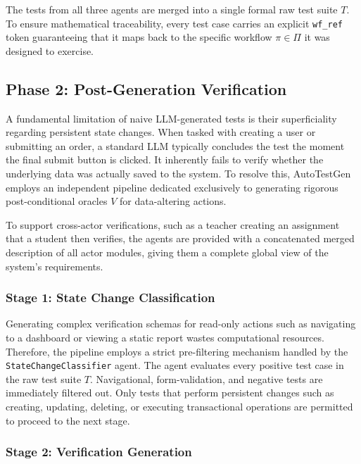 The tests from all three agents are merged into a single formal raw test suite $T$. To ensure mathematical traceability, every test case carries an explicit \texttt{wf\_ref} token guaranteeing that it maps back to the specific workflow $\pi \in \Pi$ it was designed to exercise.

\subsection{Phase 2: Post-Generation Verification}

A fundamental limitation of naive LLM-generated tests is their superficiality regarding persistent state changes. When tasked with creating a user or submitting an order, a standard LLM typically concludes the test the moment the final submit button is clicked. It inherently fails to verify whether the underlying data was actually saved to the system. To resolve this, AutoTestGen employs an independent pipeline dedicated exclusively to generating rigorous post-conditional oracles $V$ for data-altering actions.

To support cross-actor verifications, such as a teacher creating an assignment that a student then verifies, the agents are provided with a concatenated merged description of all actor modules, giving them a complete global view of the system's requirements.

\subsubsection{Stage 1: State Change Classification}

Generating complex verification schemas for read-only actions such as navigating to a dashboard or viewing a static report wastes computational resources. Therefore, the pipeline employs a strict pre-filtering mechanism handled by the \texttt{StateChangeClassifier} agent. The agent evaluates every positive test case in the raw test suite $T$. Navigational, form-validation, and negative tests are immediately filtered out. Only tests that perform persistent changes such as creating, updating, deleting, or executing transactional operations are permitted to proceed to the next stage.

\subsubsection{Stage 2: Verification Generation}

